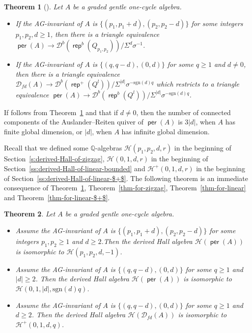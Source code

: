 \documentclass[reqno,12pt,a4paper]{amsart}
\newtheorem{theorem}{Theorem}[section]
\theoremstyle{remark}
\theoremstyle{definition}
\newcommand{\opname}[1]{\operatorname{\mathsf{#1}}}
\newcommand{\rep}{\opname{rep}\nolimits}
\newcommand{\per}{\opname{per}\nolimits}
\newcommand{\cd}{{\mathcal D}}
\newcommand{\ch}{{\mathcal H}}
\numberwithin{equation}{section}
\begin{document}
\begin{theorem}[{\cite[Theorem 6.6]{ChenYang25}}]
\label{thm:from-gentle-one-cycle-to-root-category}
Let $A$ be a graded gentle one-cycle algebra.
\begin{itemize}
\item[(a)] If the AG-invariant of $A$ is $\{(p_1,p_1+d),(p_2,p_2-d)\}$ for some integers $p_1,p_2,d\geq 1$, then there is a triangle equivalence $\per(A)\to\cd^b(\rep^b(Q_{p_1,p_2}))/\Sigma^d\sigma^{-1}$.
\item[(b)] If the AG-invariant of $A$ is $\{(q,q-d),(0,d)\}$ for some $q\geq 1$ and $d\neq 0$, then there is a triangle equivalence $\cd_{fd}(A)\to\cd^b(\rep^+(Q^l))/\Sigma^{|d|}\sigma^{-\mathrm{sgn}(d)q}$ which restricts to a triangle equivalence $\per(A)\to\cd^b(\rep^b(Q^l))/\Sigma^{|d|}\sigma^{-\mathrm{sgn}(d)q}$.
\end{itemize}
\end{theorem}

If follows from Theorem~\ref{thm:from-gentle-one-cycle-to-root-category} and \cite[Lemmas 4.3 and 4.7]{ChenYang25} that if $d\neq 0$, then the number of connected components of the Auslander--Reiten quiver of $\per(A)$ is $3|d|$, when $A$ has finite global dimension, or $|d|$, when $A$ has infinite global dimension.

Recall that we defined some $\mathbb{Q}$-algebras $\ch(p_1,p_2,d,r)$ in the beginning of Section~\ref{s:derived-Hall-of-zigzag}, $\ch(0,1,d,r)$ in the beginning of Section~\ref{ss:derived-Hall-of-linear-bounded} and $\ch^+(0,1,d,r)$ in the beginning of Section~\ref{ss:derived-Hall-of-linear-$+$}. The following theorem is an immediate consequence of Theorem~\ref{thm:from-gentle-one-cycle-to-root-category}, Theorem~\ref{thm-for-zigzag}, Theorem~\ref{thm-for-linear} and Theorem~\ref{thm-for-linear-$+$}.

\begin{theorem}
\label{thm:derived-hall-algebra}
Let $A$ be a graded gentle one-cycle algebra.
\begin{itemize}
\item[(a)] Assume the AG-invariant of $A$ is $\{(p_1,p_1+d),(p_2,p_2-d)\}$ for some integers $p_1,p_2\geq 1$ and $d\geq 2$.Then the derived Hall algebra $\ch(\per(A))$ is isomorphic to $\ch(p_1,p_2,d,-1)$.
\item[(b)] Assume the AG-invariant of $A$ is $\{(q,q-d),(0,d)\}$ for some $q\geq 1$ and $|d|\geq 2$. Then the derived Hall algebra $\ch(\per(A))$ is isomorphic to $\ch(0,1,|d|,\mathrm{sgn}(d)q)$.
\item[(c)] Assume the AG-invariant of $A$ is $\{(q,q-d),(0,d)\}$ for some $q\geq 1$ and $d\geq 2$. Then the derived Hall algebra $\ch(\cd_{fd}(A))$ is isomorphic to $\ch^+(0,1,d,q)$.
\end{itemize}
\end{theorem}
\end{document}
